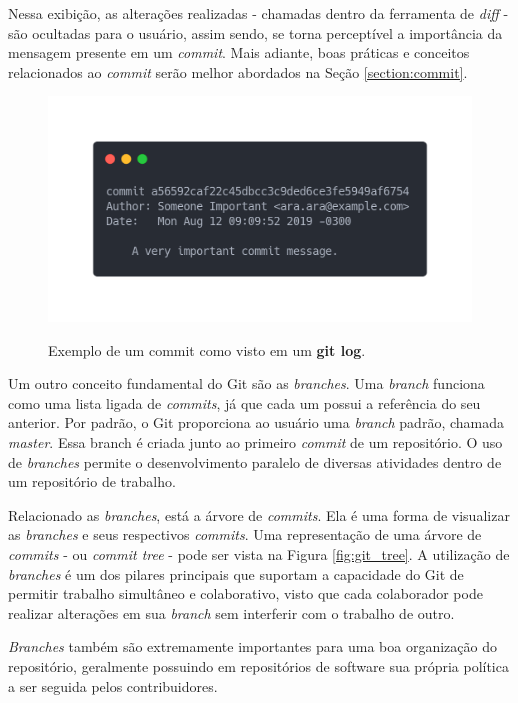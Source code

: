 Nessa exibição, as alterações realizadas - chamadas dentro da ferramenta de \textit{diff} - são ocultadas para o usuário, assim sendo, se torna perceptível a importância da mensagem presente em um \textit{commit}. Mais adiante, boas práticas e conceitos relacionados ao \textit{commit} serão melhor abordados na Seção \ref{section:commit}. %

\begin{figure}[h]
\includegraphics[width=12cm]{figuras/carbon.png}
\centering
\label{fig:commit_example}
\caption{Exemplo de um commit como visto em um \textbf{git log}.}
\end{figure}

Um outro conceito fundamental do Git são as \textit{branches}. Uma \textit{branch} funciona como uma lista ligada de \textit{commits}, já que cada um possui a referência do seu anterior. Por padrão, o Git proporciona ao usuário uma \textit{branch} padrão, chamada \textit{master}. Essa branch é criada junto ao primeiro \textit{commit} de um repositório. O uso de \textit{branches} permite o desenvolvimento paralelo de diversas atividades dentro de um repositório de trabalho.

Relacionado as \textit{branches}, está a árvore de \textit{commits}. Ela é uma forma de visualizar as \textit{branches} e seus respectivos \textit{commits}. Uma representação de uma árvore de \textit{commits} - ou \textit{commit tree} - pode ser vista na Figura \ref{fig:git_tree}.  A utilização de \textit{branches} é um dos pilares principais que suportam a capacidade do Git de permitir trabalho simultâneo e colaborativo, visto que cada colaborador pode realizar alterações em sua \textit{branch} sem interferir com o trabalho de outro.


\textit{Branches} também são extremamente importantes para uma boa organização do repositório, geralmente possuindo em repositórios de software sua própria política a ser seguida pelos contribuidores.

